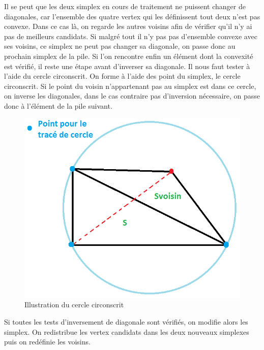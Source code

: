 \documentclass[10pt,a4paper]{report}
\begin{document}
\hspace*{10mm}Il se peut que les deux simplex en cours de traitement ne puissent changer de diagonales, car l'ensemble des quatre vertex qui les définissent tout deux n'est pas convexe. Dans ce cas là, on regarde les autres voisins afin de vérifier qu'il n'y ai pas de meilleurs candidats. Si malgré tout il n'y pas pas d'ensemble convexe avec ses voisins, ce simplex ne peut pas changer sa diagonale, on passe donc au prochain simplex de la pile.
Si l'on rencontre enfin un élément dont la convexité est vérifié, il reste une étape avant d'inverser sa diagonale. Il nous faut tester à l'aide du cercle circonscrit. \newline
On forme à l'aide des point du simplex, le cercle circonscrit. Si le point du voisin n'appartenant pas au simplex est dans ce cercle, on inverse les diagonales, dans le cas contraire pas d'inversion nécessaire, on passe donc à l'élément de la pile suivant.

\begin{figure}[h]
	\begin{center}
  		\includegraphics[scale=0.5]{DivisionDiagPossibleCercle.png} 
  	\end{center}
   	\caption{Illustration du cercle circonscrit}
	\label{Illustration du cercle circonscrit}
\end{figure}

Si toutes les tests d'inversement de diagonale sont vérifiés, on modifie alors les simplex. On redistribue les vertex candidats dans les deux nouveaux simplexes puis on redéfinie les voisins.
\end{document}
